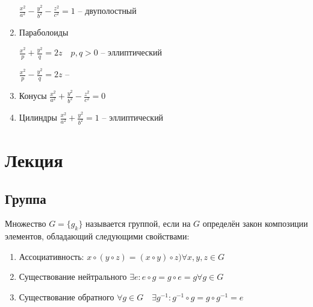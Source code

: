 \documentclass{book}
\theoremstyle{definition}
\begin{document}
\begin{enumerate}

$\frac{x^2}{a^2} - \frac{y^2}{b^2} - \frac{z^2}{c^2} = 1$ -- двуполостный

\item Параболоиды

    $\frac{x^2}{p} + \frac{y^2}{q} = 2z\quad p,q>0$ -- эллиптический

    $\frac{x^2}{p} - \frac{y^2}{q} = 2z$ -- 


\item Конусы $\frac{x^2}{a^2} + \frac{y^2}{b^2} - \frac{z^2}{c^2} = 0$
\item Цилиндры $\frac{x^2}{a^2} + \frac{y^2}{b^2}=1$ -- эллиптический
\end{enumerate}
\section{Лекция}
\subsection{}
\subsection{Группа}
\begin{definition}
    Множество $G = \{g_k\}$ называется группой, если на $G$ определён закон композиции элементов, обладающий следующими свойствами:
     \begin{enumerate}
         \item Ассоциативность: $x\circ (y\circ z) = (x\circ y)\circ z)\forall x, y, z\in G$
         \item Существование нейтрального $\exists e: e\circ g = g\circ e = g\forall g\in G$
         \item Существование обратного $\forall g\in G\quad \exists g^{-1}:g^{-1}\circ g = g\circ g^{-1} = e$
    \end{enumerate}
\end{definition}
\end{document}
